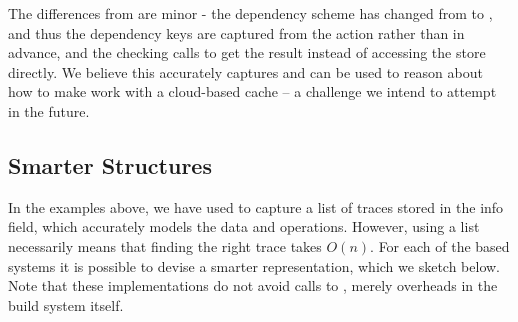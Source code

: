 The differences from  are minor - the dependency scheme has changed from  to , and thus the dependency keys  are captured from the action rather than in advance, and the checking calls  to get the result instead of accessing the store directly. We believe this accurately captures and can be used to reason about how to make \Shake work with a cloud-based cache -- a challenge we intend to attempt in the future.

\subsection{Smarter \hs{[Trace]} Structures}\label{sec-smart-traces}

In the examples above, we have used \hs{[Trace]} to capture a list of traces stored in the info field, which accurately models the data and operations. However, using a list necessarily means that finding the right trace takes $O(n)$. For each of the  based systems it is possible to devise a smarter representation, which we sketch below. Note that these implementations do not avoid calls to , merely overheads in the build system itself.


